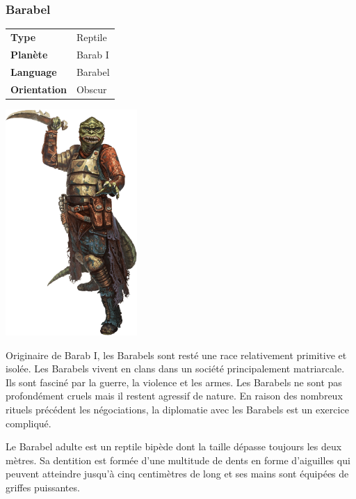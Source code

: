 \subsubsection{Barabel}

\begin{flushright}
\begin{tabular}{ l l }
	\textbf{Type} 			& Reptile \\
   	\textbf{Planète} 		& Barab I \\
   	\textbf{Language} 		& Barabel \\
   	\textbf{Orientation} 	& Obscur \\
\end{tabular}
\end{flushright}

\vspace{-5\baselineskip}
\includegraphics[width=5cm]{img/races/barabel.png}

Originaire de Barab I, les Barabels sont resté une race relativement primitive et isolée. Les Barabels vivent en clans dans un société principalement matriarcale. Ils sont fasciné par la guerre, la violence et les armes. Les Barabels ne sont pas profondément cruels mais il restent agressif de nature. En raison des nombreux rituels précédent les négociations, la diplomatie avec les Barabels est un exercice compliqué.

Le Barabel adulte est un reptile bipède dont la taille dépasse toujours les deux mètres. Sa dentition est formée d'une multitude de dents en forme d'aiguilles qui peuvent atteindre jusqu'à cinq centimètres de long et ses mains sont équipées de griffes puissantes.

